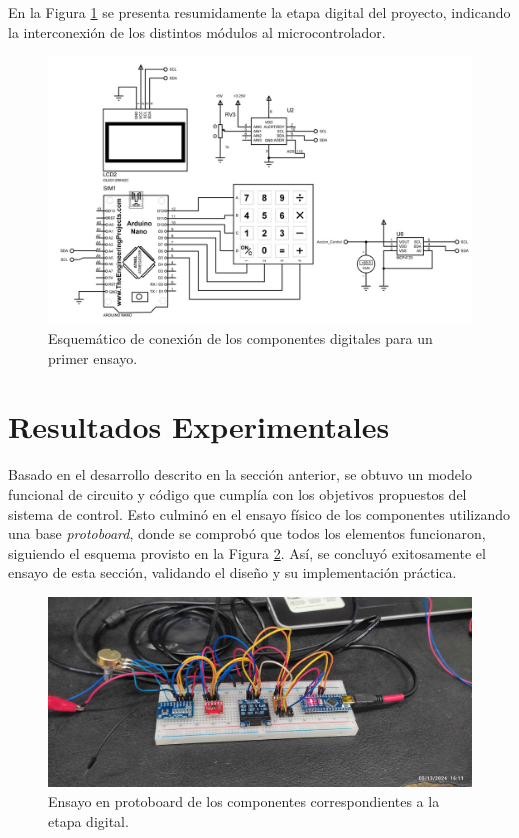 En la Figura \ref{F:esquematico_proteus} se presenta resumidamente la etapa digital del proyecto, indicando la interconexión de los distintos módulos al microcontrolador.
\begin{figure}[H]
    \centering
    \includegraphics[width=\textwidth]{./imagenes/proteus_esquema2.jpg}
    \caption{Esquemático de conexión de los componentes digitales para un primer ensayo.}
    \label{F:esquematico_proteus}
\end{figure}

\section{Resultados Experimentales}
Basado en el desarrollo descrito en la sección anterior, se obtuvo un modelo funcional de circuito y código que cumplía con los objetivos propuestos del sistema de control. Esto culminó en el ensayo físico de los componentes utilizando una base \textit{protoboard}, donde se comprobó que todos los elementos funcionaron, siguiendo el esquema provisto en la Figura \ref{F:ensayo_digital}. Así, se concluyó exitosamente el ensayo de esta sección, validando el diseño y su implementación práctica.
\begin{figure}[H]
    \centering
    \includegraphics[scale=0.08]{./imagenes/ensayo_digital.jpg}
    \caption{Ensayo en protoboard de los componentes correspondientes a la etapa digital.}
    \label{F:ensayo_digital}
\end{figure}

